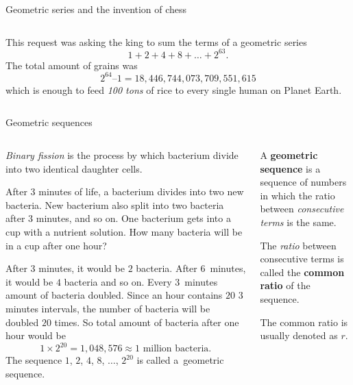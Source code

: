 \documentclass[9pt,aspectratio=169]{beamer}
\begin{document}
\begin{frame}{Geometric series and the invention of chess}
\begin{columns}[T]
\begin{column}{0.5\textwidth}
      \begin{example}
        This request was asking the king to sum the terms of a geometric series
        \[ 1 + 2 + 4 + 8 + \ldots + 2^{63}. \]
        The total amount of grains was
        \[ 2^{64} – 1 = 18{,}446{,}744{,}073{,}709{,}551{,}615 \]which is enough to feed \emph{100 tons} of rice to every single human on Planet Earth.
      \end{example}
    \end{column}
  \end{columns}
\end{frame}

\begin{frame}{Geometric sequences}
  \begin{columns}[T]
    \begin{column}{0.5\textwidth}
      \emph{Binary fission} is the process by which bacterium divide into two identical daughter cells.

      \begin{problem}
        After $3$ minutes of life, a bacterium divides into two new bacteria. New bacterium also split into two bacteria after $3$ minutes, and so on. One bacterium gets into a cup with a nutrient solution. How many bacteria will be in a cup after one hour?
      \end{problem}

      After $3$ minutes, it would be $2$ bacteria. After $6$~minutes, it would be $4$ bacteria and so on. Every $3$~minutes amount of bacteria doubled. Since an hour contains $20$ $3$ minutes intervals, the number of bacteria will be doubled $20$ times. So total amount of bacteria after one hour would be 
      \[ 1 \times 2^{20} = 1{,}048{,}576 \approx 1 \text{ million bacteria.} \]
      The sequence $1$, $2$, $4$, $8$, $\ldots$, $2^{20}$ is called a~geometric sequence.
    \end{column}
    \begin{column}{0.5\textwidth}
      \begin{definition}
        A \textbf{geometric sequence} is a sequence of numbers in which the ratio between \emph{consecutive terms} is the same.
        
        The \emph{ratio} between consecutive terms is called the \textbf{common ratio} of the sequence. 
      \end{definition}
      The common ratio is usually denoted as $r$.


\end{column}
\end{columns}
\end{frame}
\end{document}
